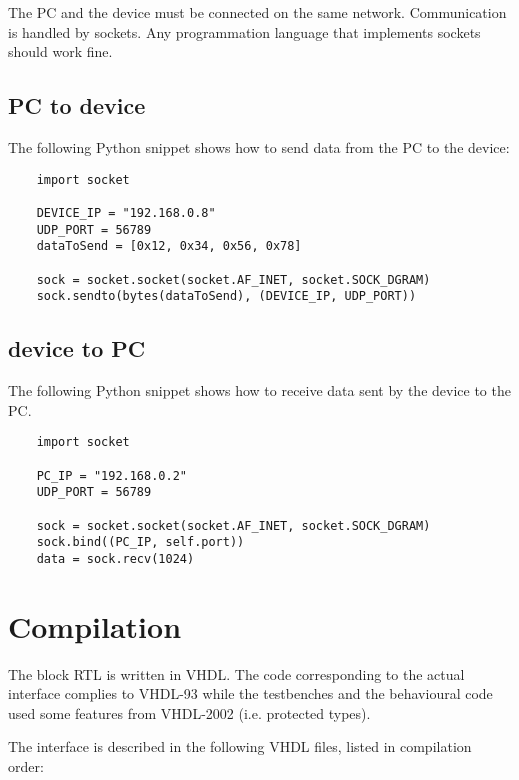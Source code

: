 \documentclass[a4paper]{hitec}
\begin{document}
The PC and the device must be connected on the same network. Communication is handled by sockets. Any programmation language that implements sockets should work fine.

\subsection{PC to device} 

The following Python snippet shows how to send data from the PC to the device:
\begin{lstlisting}
	import socket

	DEVICE_IP = "192.168.0.8"
	UDP_PORT = 56789
	dataToSend = [0x12, 0x34, 0x56, 0x78]

	sock = socket.socket(socket.AF_INET, socket.SOCK_DGRAM)
	sock.sendto(bytes(dataToSend), (DEVICE_IP, UDP_PORT))
\end{lstlisting}

\subsection{device to PC}

The following Python snippet shows how to receive data sent by the device to the PC. 
\begin{lstlisting}
	import socket

	PC_IP = "192.168.0.2"
	UDP_PORT = 56789

	sock = socket.socket(socket.AF_INET, socket.SOCK_DGRAM)
	sock.bind((PC_IP, self.port))
	data = sock.recv(1024)
\end{lstlisting}



\section{Compilation}

The block RTL is written in VHDL. The code corresponding to the actual interface complies to VHDL-93 while the testbenches and the behavioural code used some features from VHDL-2002 (i.e. protected types).

The interface is described in the following VHDL files, listed in compilation order:
\end{document}
